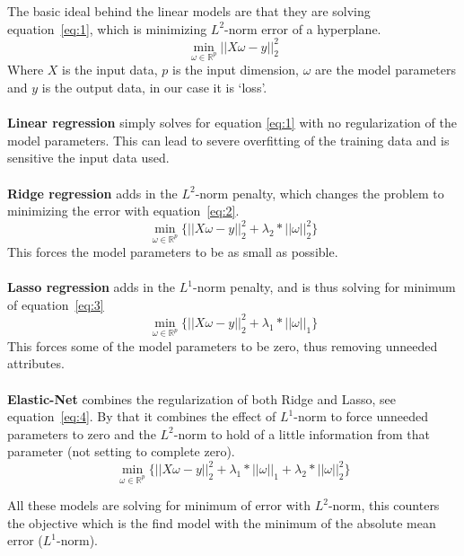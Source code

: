 \documentclass[a4paper]{article}
\begin{document}
The basic ideal behind the linear models are that they are solving equation~\ref{eq:1}, which is minimizing $L^2$-norm error of a hyperplane.
\begin{equation} \label{eq:1}
\min_{\omega\in\mathbb{R}^p}||X\omega - y||_2^2
\end{equation}
Where $X$ is the input data, $p$ is the input dimension, $\omega$ are the model parameters and $y$ is the output data, in our case it is ‘loss’. \\\\
\textbf{Linear regression} simply solves for equation \ref{eq:1} with no regularization of the model parameters. This can lead to severe overfitting of the training data and is sensitive the input data used. \\\\
\textbf{Ridge regression} adds in the $L^2$-norm penalty, which changes the problem to minimizing the error with equation~\ref{eq:2}.
\begin{equation} \label{eq:2}
\min_{\omega\in\mathbb{R}^p} \{||X\omega - y||_2^2 + \lambda_2*||\omega||_2^2 \}
\end{equation}
This forces the model parameters to be as small as possible.\\\\
\textbf{Lasso regression} adds in the $L^1$-norm penalty, and is thus solving for minimum of equation~\ref{eq:3}
\begin{equation} \label{eq:3}
\min_{\omega\in\mathbb{R}^p}  \{||X\omega - y||_2^2 + \lambda_1*||\omega||_1\}
\end{equation}
This forces some of the model parameters to be zero, thus removing unneeded attributes. \\\\
\textbf{Elastic-Net} combines the regularization of both Ridge and Lasso, see equation~\ref{eq:4}. By that it combines the effect of $L^1$-norm to force unneeded parameters to zero and the $L^2$-norm to hold of a little information from that parameter (not setting to complete zero).
\begin{equation} \label{eq:4}
\min_{\omega\in\mathbb{R}^p}  \{||X\omega - y||_2^2 + \lambda_1*||\omega||_1 + \lambda_2*||\omega||_2^2\}
\end{equation}

All these models are solving for minimum of error with $L^2$-norm, this counters the objective which is the find model with the minimum of the absolute mean error ($L^1$-norm).
\end{document}
